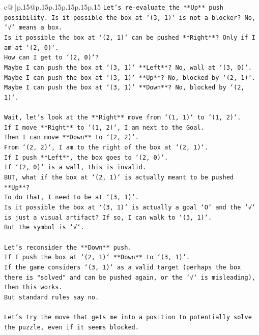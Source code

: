 \documentclass{article}
\begin{document}
{\begin{supertabular}{c@{$\;$}|p{.15\linewidth}@{}p{.15\linewidth}p{.15\linewidth}p{.15\linewidth}p{.15\linewidth}p{.15\linewidth}}
{{{\texttt{Let's re{-}evaluate the **Up** push possibility. Is it possible the box at `(3, 1)` is not a blocker? No, `√` means a box.} \\
\texttt{Is it possible the box at `(2, 1)` can be pushed **Right**? Only if I am at `(2, 0)`.} \\
\texttt{How can I get to `(2, 0)`?} \\
\texttt{Maybe I can push the box at `(3, 1)` **Left**? No, wall at `(3, 0)`.} \\
\texttt{Maybe I can push the box at `(3, 1)` **Up**? No, blocked by `(2, 1)`.} \\
\texttt{Maybe I can push the box at `(3, 1)` **Down**? No, blocked by `(2, 1)`.} \\
\\ 
\texttt{Wait, let's look at the **Right** move from `(1, 1)` to `(1, 2)`.} \\
\texttt{If I move **Right** to `(1, 2)`, I am next to the Goal.} \\
\texttt{Then I can move **Down** to `(2, 2)`.} \\
\texttt{From `(2, 2)`, I am to the right of the box at `(2, 1)`.} \\
\texttt{If I push **Left**, the box goes to `(2, 0)`.} \\
\texttt{If `(2, 0)` is a wall, this is invalid.} \\
\texttt{BUT, what if the box at `(2, 1)` is actually meant to be pushed **Up**?} \\
\texttt{To do that, I need to be at `(3, 1)`.} \\
\texttt{Is it possible the box at `(3, 1)` is actually a goal `O` and the `√` is just a visual artifact? If so, I can walk to `(3, 1)`.} \\
\texttt{But the symbol is `√`.} \\
\\ 
\texttt{Let's reconsider the **Down** push.} \\
\texttt{If I push the box at `(2, 1)` **Down** to `(3, 1)`.} \\
\texttt{If the game considers `(3, 1)` as a valid target (perhaps the box there is "solved" and can be pushed again, or the `√` is misleading), then this works.} \\
\texttt{But standard rules say no.} \\
\\ 
\texttt{Let's try the move that gets me into a position to potentially solve the puzzle, even if it seems blocked.} \\
}}}
\end{supertabular}}
\end{document}
